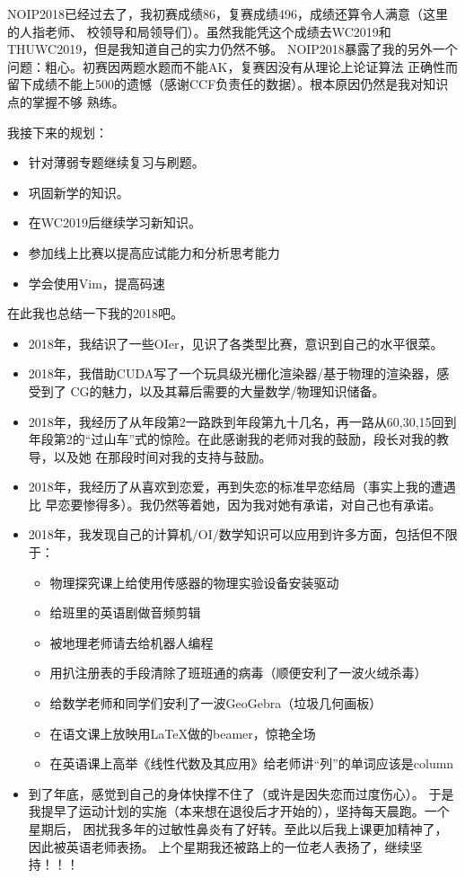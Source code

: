 NOIP2018已经过去了，我初赛成绩86，复赛成绩496，成绩还算令人满意（这里的人指老师、
校领导和局领导们）。虽然我能凭这个成绩去WC2019和THUWC2019，但是我知道自己的实力仍然不够。
NOIP2018暴露了我的另外一个问题：粗心。初赛因两题水题而不能AK，复赛因没有从理论上论证算法
正确性而留下成绩不能上500的遗憾（感谢CCF负责任的数据）。根本原因仍然是我对知识点的掌握不够
熟练。

我接下来的规划：

\begin{itemize}
    \item 针对薄弱专题继续复习与刷题。
    \item 巩固新学的知识。
    \item 在WC2019后继续学习新知识。
    \item 参加线上比赛以提高应试能力和分析思考能力
    \item 学会使用Vim，提高码速
\end{itemize}

在此我也总结一下我的2018吧。
\begin{itemize}
    \item 2018年，我结识了一些OIer，见识了各类型比赛，意识到自己的水平很菜。
    \item 2018年，我借助CUDA写了一个玩具级光栅化渲染器/基于物理的渲染器，感受到了
    CG的魅力，以及其幕后需要的大量数学/物理知识储备。
    \item 2018年，我经历了从年段第2一路跌到年段第九十几名，再一路从60,30,15回到
    年段第2的``过山车''式的惊险。在此感谢我的老师对我的鼓励，段长对我的教导，以及她
    在那段时间对我的支持与鼓励。
    \item 2018年，我经历了从喜欢到恋爱，再到失恋的标准早恋结局（事实上我的遭遇比
    早恋要惨得多）。我仍然等着她，因为我对她有承诺，对自己也有承诺。
    \item 2018年，我发现自己的计算机/OI/数学知识可以应用到许多方面，包括但不限于：
    \begin{itemize}
        \item 物理探究课上给使用传感器的物理实验设备安装驱动
        \item 给班里的英语剧做音频剪辑
        \item 被地理老师请去给机器人编程
        \item 用扒注册表的手段清除了班班通的病毒（顺便安利了一波火绒杀毒）
        \item 给数学老师和同学们安利了一波GeoGebra（垃圾几何画板）
        \item 在语文课上放映用\LaTeX{}做的beamer，惊艳全场
        \item 在英语课上高举《线性代数及其应用》给老师讲``列''的单词应该是column
    \end{itemize}
    \item 到了年底，感觉到自己的身体快撑不住了（或许是因失恋而过度伤心）。
    于是我提早了运动计划的实施（本来想在退役后才开始的），坚持每天晨跑。一个星期后，
    困扰我多年的过敏性鼻炎有了好转。至此以后我上课更加精神了，因此被英语老师表扬。
    上个星期我还被路上的一位老人表扬了，继续坚持！！！
\end{itemize}

